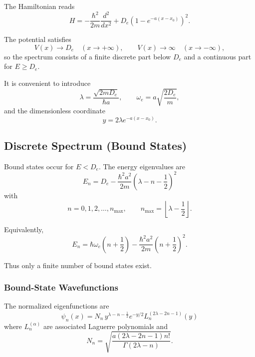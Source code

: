 \documentclass[11pt]{article}
\begin{document}
The Hamiltonian reads
\begin{equation}
H = -\frac{\hbar^2}{2m}\frac{d^2}{dx^2}
+ D_e\left(1-e^{-a(x-x_0)}\right)^2.
\end{equation}

The potential satisfies
\[
V(x)\to D_e \quad (x\to+\infty), 
\qquad
V(x)\to\infty \quad (x\to -\infty),
\]
so the spectrum consists of a finite discrete part below $D_e$ and a continuous part for $E\ge D_e$.

It is convenient to introduce
\begin{equation}
\lambda = \frac{\sqrt{2mD_e}}{\hbar a},
\qquad
\omega_e = a\sqrt{\frac{2D_e}{m}},
\end{equation}
and the dimensionless coordinate
\begin{equation}
y = 2\lambda e^{-a(x-x_0)}.
\end{equation}

\subsection{Discrete Spectrum (Bound States)}

Bound states occur for $E<D_e$. The energy eigenvalues are
\begin{equation}
\boxed{
E_n
=
D_e
-
\frac{\hbar^2 a^2}{2m}
\left(\lambda-n-\frac12\right)^2
}
\end{equation}
with
\begin{equation}
n = 0,1,2,\dots,n_{\max},
\qquad
n_{\max} = \left\lfloor \lambda-\frac12 \right\rfloor.
\end{equation}

Equivalently,
\begin{equation}
E_n
=
\hbar\omega_e\left(n+\frac12\right)
-
\frac{\hbar^2 a^2}{2m}
\left(n+\frac12\right)^2.
\end{equation}

Thus only a finite number of bound states exist.

\subsubsection*{Bound-State Wavefunctions}

The normalized eigenfunctions are
\begin{equation}
\boxed{
\psi_n(x)
=
N_n\,
y^{\lambda-n-\frac12}
e^{-y/2}
L_n^{(2\lambda-2n-1)}(y)
}
\end{equation}
where $L_n^{(\alpha)}$ are associated Laguerre polynomials and
\begin{equation}
N_n
=
\sqrt{
\frac{a(2\lambda-2n-1)n!}
{\Gamma(2\lambda-n)}
}.
\end{equation}
\end{document}
